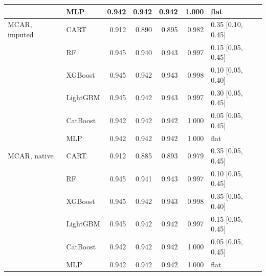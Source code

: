 \documentclass[pdflatex,sn-mathphys]{sn-jnl}
\theoremstyle{thmstyleone}
\begin{document}
\begin{table}[htbp]
\begin{tabular}{@{}llrrrrl@{}}
 & MLP & 0.942 & 0.942 & 0.942 & 1.000 & flat \\
\midrule
MCAR, imputed & CART & 0.912 & 0.890 & 0.895 & 0.982 & 0.35 [0.10, 0.45] \\
 & RF & 0.945 & 0.940 & 0.943 & 0.997 & 0.15 [0.05, 0.45] \\
 & XGBoost & 0.945 & 0.942 & 0.943 & 0.998 & 0.10 [0.05, 0.40] \\
 & LightGBM & 0.945 & 0.942 & 0.943 & 0.997 & 0.30 [0.05, 0.45] \\
 & CatBoost & 0.942 & 0.942 & 0.942 & 1.000 & 0.05 [0.05, 0.45] \\
 & MLP & 0.942 & 0.942 & 0.942 & 1.000 & flat \\
\midrule
MCAR, native & CART & 0.912 & 0.885 & 0.893 & 0.979 & 0.35 [0.05, 0.45] \\
 & RF & 0.945 & 0.941 & 0.943 & 0.997 & 0.10 [0.05, 0.45] \\
 & XGBoost & 0.945 & 0.942 & 0.943 & 0.998 & 0.35 [0.05, 0.40] \\
 & LightGBM & 0.945 & 0.942 & 0.942 & 0.997 & 0.15 [0.05, 0.45] \\
 & CatBoost & 0.942 & 0.942 & 0.942 & 1.000 & 0.05 [0.05, 0.45] \\
 & MLP & 0.942 & 0.942 & 0.942 & 1.000 & flat \\
\bottomrule
\end{tabular}
\end{table}
\end{document}
